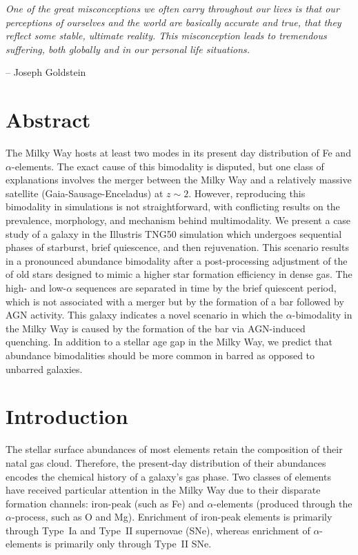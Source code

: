 
\begin{adjustwidth}{.8cm}{0cm}
\textit{One of the great misconceptions we often carry throughout our lives is that our perceptions of ourselves and the world are basically accurate and true, that they reflect some stable, ultimate reality. This misconception leads to tremendous suffering, both globally and in our personal life situations.}

\hspace{9cm} -- Joseph Goldstein
\end{adjustwidth}

\section{Abstract}
    The Milky Way hosts at least two modes in its present day distribution of Fe and $\alpha$-elements. The exact cause of this bimodality is disputed, but one class of explanations involves the merger between the Milky Way and a relatively massive satellite (Gaia-Sausage-Enceladus) at $z\sim2$. However, reproducing this bimodality in simulations is not straightforward, with conflicting results on the prevalence, morphology, and mechanism behind multimodality. We present a case study of a galaxy in the Illustris TNG50 simulation which undergoes sequential phases of starburst, brief quiescence, and then rejuvenation. This scenario results in a pronounced abundance bimodality after a post-processing adjustment of the \alphaFe{} of old stars designed to mimic a higher star formation efficiency in dense gas. The high- and low-$\alpha$ sequences are separated in time by the brief quiescent period, which is not associated with a merger but by the formation of a bar followed by AGN activity. This galaxy indicates a novel scenario in which the $\alpha$-bimodality in the Milky Way is caused by the formation of the bar via AGN-induced quenching. In addition to a stellar age gap in the Milky Way, we predict that abundance bimodalities should be more common in barred as opposed to unbarred galaxies.
    
\section{Introduction}\label{sec:intro}
The stellar surface abundances of most elements retain the composition of their natal gas cloud. Therefore, the present-day distribution of their abundances encodes the chemical history of a galaxy's gas phase. Two classes of elements have received particular attention in the Milky Way due to their disparate formation channels: iron-peak (such as Fe) and $\alpha$-elements (produced through the $\alpha$-process, such as O and Mg). Enrichment of iron-peak elements is primarily through Type~Ia and Type~II supernovae (SNe), whereas enrichment of $\alpha$-elements is primarily only through Type~II SNe.

